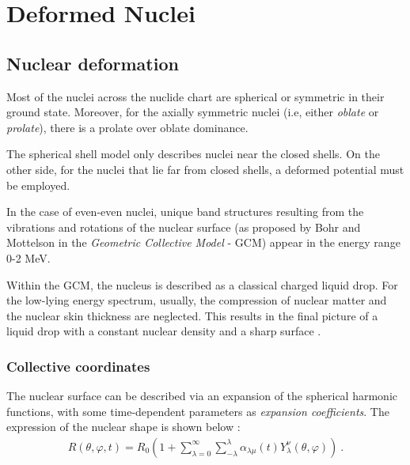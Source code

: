 \chapter{Deformed Nuclei}

\section{Nuclear deformation}

Most of the nuclei across the nuclide chart are spherical or symmetric in their ground state. Moreover, for the axially symmetric nuclei (i.e, either \emph{oblate} or \emph{prolate}), there is a prolate over oblate dominance.

The spherical shell model only describes nuclei near the closed shells. On the other side, for the nuclei that lie far from closed shells, a deformed potential must be employed. 
\par In the case of even-even nuclei, unique band structures resulting from the vibrations and rotations of the nuclear surface (as proposed by Bohr and Mottelson \cite{bohr1998nuclear} in the \emph{Geometric Collective Model} - GCM) appear in the energy range 0-2 MeV.

Within the GCM, the nucleus is described as a classical charged liquid drop. For the low-lying energy spectrum, usually, the compression of nuclear matter and the nuclear skin thickness are neglected. This results in the final picture of a liquid drop with a constant nuclear density and a sharp surface \cite{greiner1996nuclear}.

\subsection{Collective coordinates}

The nuclear surface can be described via an expansion of the spherical harmonic functions, with some time-dependent parameters as \emph{expansion coefficients}. The expression of the nuclear shape is shown below \cite{greiner1996nuclear}:
\begin{align}
    R(\theta,\varphi,t)=R_0\left(1+\sum_{\lambda=0}^\infty\sum_{-\lambda}^\lambda\alpha_{\lambda\mu}(t)Y_\lambda^\nu(\theta,\varphi)\right)\ .
    \label{nuclear-shape}
\end{align}

